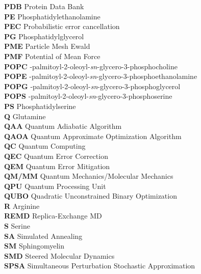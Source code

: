 \documentclass[12pt, twoside, openany]{book}
\begin{document}
\begin{flushleft}
\begin{tabbing}
        \textbf{PDB} \> Protein Data Bank \\
        \textbf{PE} \> Phosphatidylethanolamine \\
        \textbf{PEC} \> Probabilistic error cancellation \\
        \textbf{PG} \> Phosphatidylglycerol \\
        \textbf{PME} \> Particle Mesh Ewald \\
        \textbf{PMF} \> Potential of Mean Force \\
        \textbf{POPC} -palmitoyl-2-oleoyl-\textit{sn}-glycero-3-phosphocholine \\
        \textbf{POPE} -palmitoyl-2-oleoyl-\textit{sn}-glycero-3-phosphoethanolamine \\
        \textbf{POPG} -palmitoyl-2-oleoyl-\textit{sn}-glycero-3-phosphoglycerol \\
        \textbf{POPS} -palmitoyl-2-oleoyl-\textit{sn}-glycero-3-phosphoserine \\
        \textbf{PS} \> Phosphatidylserine \\
        \textbf{Q} \> Glutamine \\
        \textbf{QAA} \> Quantum Adiabatic Algorithm \\
        \textbf{QAOA} \> Quantum Approximate Optimization Algorithm \\
        \textbf{QC} \> Quantum Computing \\
        \textbf{QEC} \> Quantum Error Correction \\
        \textbf{QEM} \> Quantum Error Mitigation \\
        \textbf{QM/MM} \> Quantum Mechanics/Molecular Mechanics \\
        \textbf{QPU} \> Quantum Processing Unit \\
        \textbf{QUBO} \> Quadratic Unconstrained Binary Optimization \\
        \textbf{R} \> Arginine \\
        \textbf{REMD} \> Replica-Exchange MD \\
        \textbf{S} \> Serine \\
        \textbf{SA} \> Simulated Annealing \\
        \textbf{SM} \> Sphingomyelin \\
        \textbf{SMD} \> Steered Molecular Dynamics \\
        \textbf{SPSA} \> Simultaneous Perturbation Stochastic Approximation \\

\end{tabbing}
\end{flushleft}
\end{document}
